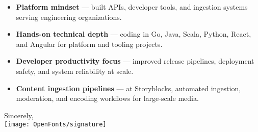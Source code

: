 \documentclass[]{cover}
\begin{document}

\begin{itemize}
    \item \textbf{Platform mindset} — built APIs, developer tools, and ingestion systems serving engineering organizations.
    \item \textbf{Hands-on technical depth} — coding in Go, Java, Scala, Python, React, and Angular for platform and tooling projects.
    \item \textbf{Developer productivity focus} — improved release pipelines, deployment safety, and system reliability at scale.
    \item \textbf{Content ingestion pipelines} — at Storyblocks, automated ingestion, moderation, and encoding workflows for large-scale media.
\end{itemize}


   



\vspace{0.5cm}

\closing{Sincerely,\\ \vspace{.1cm} \texttt{[image: OpenFonts/signature]} \vspace{-1cm} }

\signature{Rocky Gray Jr.}
\end{document}
